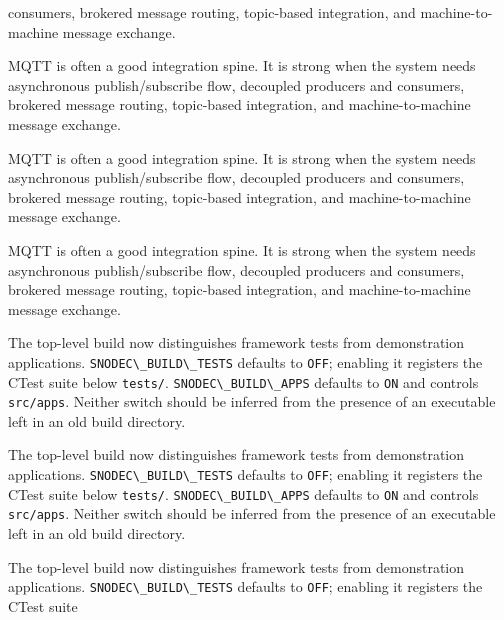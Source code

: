 \documentclass[
  a4paper,
  openany]{book}
\providecommand{\passthrough}[1]{#1}
\begin{document}
consumers, brokered message routing, topic-based integration, and
machine-to-machine message exchange.\par
\clearpage
{}
MQTT is often a good integration spine. It is strong when the system
needs asynchronous publish/subscribe flow, decoupled producers and
consumers, brokered message routing, topic-based integration, and
machine-to-machine message exchange.\par
\clearpage
{}
\begingroup\raggedright MQTT is often a good integration spine. It is strong when the system
needs asynchronous publish/subscribe flow, decoupled producers and
consumers, brokered message routing, topic-based integration, and
machine-to-machine message exchange.\par\endgroup
\clearpage
{}
MQTT is often a good integration spine. It is strong when the system
needs asynchronous publish/\allowbreak{}subscribe flow, decoupled producers and
consumers, brokered message routing, topic-based integration, and
machine-to-machine message exchange.\par
\clearpage
{}
The top-level build now distinguishes framework tests from demonstration
applications. \passthrough{\lstinline!SNODEC\_BUILD\_TESTS!} defaults to
\passthrough{\lstinline!OFF!}; enabling it registers the CTest suite
below \passthrough{\lstinline!tests/!}.
\passthrough{\lstinline!SNODEC\_BUILD\_APPS!} defaults to
\passthrough{\lstinline!ON!} and controls
\passthrough{\lstinline!src/apps!}. Neither switch should be inferred
from the presence of an executable left in an old build directory.\par
\clearpage
{}
The top-level build now distinguishes framework tests from demonstration
applications. \passthrough{\lstinline!SNODEC\_BUILD\_TESTS!} defaults to
\passthrough{\lstinline!OFF!}; enabling it registers the CTest suite
below \passthrough{\lstinline!tests/!}.
\passthrough{\lstinline!SNODEC\_BUILD\_APPS!} defaults to
\passthrough{\lstinline!ON!} and controls
\passthrough{\lstinline!src/apps!}. Neither switch should be inferred
from the presence of an executable left in an old build directory.\par
\clearpage
{}
The top-level build now distinguishes framework tests from demonstration
applications. \passthrough{\lstinline!SNODEC\_BUILD\_TESTS!} defaults to
\passthrough{\lstinline!OFF!}; enabling it registers the CTest suite
\end{document}
